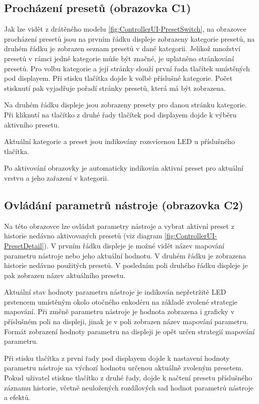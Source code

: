 \documentclass[thesis=M,czech]{FITthesis}[2019/03/06]
\begin{document}
	\subsection{Procházení presetů (obrazovka C1)}\label{sec:C1}
	Jak lze vidět z drátěného modelu \ref{fig:ControllerUI-PresetSwitch}, na obrazovce procházení presetů jsou na prvním řádku displeje
	zobrazeny kategorie presetů, na druhém řádku je zobrazen seznam presetů v dané kategorii.
	Jelikož množství presetů v rámci jedné kategorie může být značné, je uplatněno stránkování presetů.
	Pro volbu kategorie a její stránky slouží první řada tlačítek umístěných pod displayem.
	Při stisku tlačítka dojde k volbě příslušné kategorie. Počet stisknutí pak vyjadřuje pořadí stránky presetů, která má být zobrazena.
	
	Na druhém řádku displeje jsou zobrazeny presety pro danou stránku kategorie. Při kliknutí na tlačítko 
	z druhé řady tlačítek pod displayem dojde k výběru aktivního presetu.
	
	Aktuální kategorie a preset jsou indikovány rozsvícenou LED u příslušného tlačítka.
	
	Po aktivování obrazovky je automaticky indikován aktivní preset pro
	aktuální vrstvu a jeho zařazení v kategorii.
	
	\subsection{Ovládání parametrů nástroje (obrazovka C2)}\label{sec:C2}
	Na této obrazovce lze ovládat parametry nástroje a vybrat aktivní preset z historie nedávno aktivovaných presetů (viz diagram \ref{fig:ControllerUI-PresetDetail}).
	V prvním řádku displeje je možné vidět název mapování parametru nástroje nebo jeho aktuální hodnotu. V druhém řádku
	je zobrazena historie nedávno použitých presetů. V posledním poli druhého řádku displeje je pak zobrazen název
	aktuálního presetu.
	
	Aktuální stav hodnoty parametru nástroje je indikován nepřetržitě LED prstencem umístěným okolo otočného enkodéru na základě
	zvolené strategie mapování. Při změně parametru nástroje je hodnota zobrazena i graficky v příslušném poli na displeji, jinak je v poli zobrazen název mapování parametru.
	Formát zobrazení hodnoty parametru na displeji je opět určen strategií mapování parametru.
	
	Při stisku tlačítka z první řady pod displayem dojde k nastavení hodnoty parametru nástroje na výchozí hodnotu určenou aktuálně zvoleným presetem.		
	Pokud uživatel stiskne tlačítko z druhé řady, dojde k načtení presetu příslušného záznamu historie, včetně neuložených rozdílových sad hodnot parametrů nástroje a efektů.
	
\end{document}
